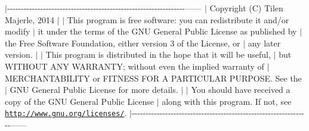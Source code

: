 $\vert$-\/-\/-\/-\/-\/-\/-\/-\/-\/-\/-\/-\/-\/-\/-\/-\/-\/-\/-\/-\/-\/-\/-\/-\/-\/-\/-\/-\/-\/-\/-\/-\/-\/-\/-\/-\/-\/-\/-\/-\/-\/-\/-\/-\/-\/-\/-\/-\/-\/-\/-\/-\/-\/-\/-\/-\/-\/-\/-\/-\/-\/-\/-\/-\/------ $\vert$ Copyright (C) Tilen Majerle, 2014 $\vert$ $\vert$ This program is free software\+: you can redistribute it and/or modify $\vert$ it under the terms of the G\+N\+U General Public License as published by $\vert$ the Free Software Foundation, either version 3 of the License, or $\vert$ any later version. $\vert$ $\vert$ This program is distributed in the hope that it will be useful, $\vert$ but W\+I\+T\+H\+O\+U\+T A\+N\+Y W\+A\+R\+R\+A\+N\+T\+Y; without even the implied warranty of $\vert$ M\+E\+R\+C\+H\+A\+N\+T\+A\+B\+I\+L\+I\+T\+Y or F\+I\+T\+N\+E\+S\+S F\+O\+R A P\+A\+R\+T\+I\+C\+U\+L\+A\+R P\+U\+R\+P\+O\+S\+E. See the $\vert$ G\+N\+U General Public License for more details. $\vert$ $\vert$ You should have received a copy of the G\+N\+U General Public License $\vert$ along with this program. If not, see \href{http://www.gnu.org/licenses/}{\tt http\+://www.\+gnu.\+org/licenses/}. $\vert$-\/-\/-\/-\/-\/-\/-\/-\/-\/-\/-\/-\/-\/-\/-\/-\/-\/-\/-\/-\/-\/-\/-\/-\/-\/-\/-\/-\/-\/-\/-\/-\/-\/-\/-\/-\/-\/-\/-\/-\/-\/-\/-\/-\/-\/-\/-\/-\/-\/-\/-\/-\/-\/-\/-\/-\/-\/-\/-\/-\/-\/-\/-\/-\/------ 